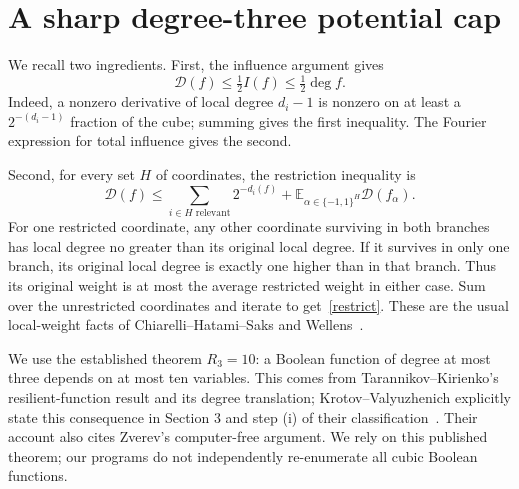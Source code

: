 \documentclass[11pt]{amsart}
\newcommand{\D}{\mathcal D}
\begin{document}
\section{A sharp degree-three potential cap}
We recall two ingredients. First, the influence argument gives
\begin{equation}\label{influence}
 \D(f)\le \tfrac12 I(f)\le \tfrac12\deg f.
\end{equation}
Indeed, a nonzero derivative of local degree $d_i-1$ is nonzero on at least
a $2^{-(d_i-1)}$ fraction of the cube; summing gives the first inequality.
The Fourier expression for total influence gives the second.

Second, for every set $H$ of coordinates, the restriction inequality is
\begin{equation}\label{restrict}
 \D(f)\le\sum_{i\in H\text{ relevant}}2^{-d_i(f)}
             +\mathbb E_{\alpha\in\{-1,1\}^H}\D(f_\alpha).
\end{equation}
For one restricted coordinate, any other coordinate surviving in both
branches has local degree no greater than its original local degree. If
it survives in only one branch, its original local degree is exactly one
higher than in that branch. Thus its original weight is at most the
average restricted weight in either case. Sum over the unrestricted
coordinates and iterate to get~\eqref{restrict}. These are the usual
local-weight facts of Chiarelli--Hatami--Saks and Wellens~\cite{chs,wellens}.

We use the established theorem $R_3=10$: a Boolean function of degree at
most three depends on at most ten variables. This comes from
Tarannikov--Kirienko's resilient-function result and its degree translation;
Krotov--Valyuzhenich explicitly state this consequence in Section 3 and
step (i) of their classification~\cite{tk,kv}. Their account also cites
Zverev's computer-free argument. We rely on this published theorem;
our programs do not independently re-enumerate all cubic Boolean functions.
\end{document}

